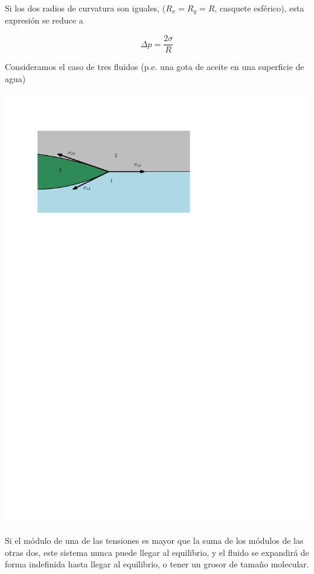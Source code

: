 Si los dos radios de curvatura son iguales, ($R_x=R_y=R$, casquete esférico), esta expresión se reduce a 
 
\begin{equation}
	\Delta p = \frac{2\sigma}{R}
\end{equation}

Consideramos el caso de tres fluidos (p.e. una gota de aceite en una superficie de agua)
\begin{center}
\includegraphics{TeX_files/chapter01-Introduccion/tresFluidos}
\end{center}
Si el m\'odulo de una de las tensiones es mayor que la suma de los m\'odulos de las otras dos, este sistema nunca
puede llegar al equilibrio, y el fluido se expandir\'a de forma indefinida hasta llegar al equilibrio, o tener
un grosor de tama\~no molecular.

